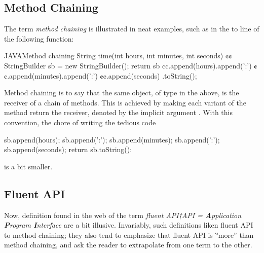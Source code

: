 \subsection{Method Chaining}
The term \emph{method chaining} is illustrated in neat examples, such
as in the  to  line of the following \Java function:
\begin{Code}{JAVA}{Method chaining}
String time(int hours, int minutes, int seconds) {¢¢
  StringBuilder sb = new StringBuilder();
  return sb
    ¢¢.append(hours).append(':')
    ¢¢.append(minutes).append(':')
    ¢¢.append(seconds)
    .toString();
}
\end{Code}
Method chaining is to say that the same object,  of type  in the above,
   is the receiver of a chain of methods.
This is achieved by making each variant of the method  return the receiver, denoted by the
  implicit argument .
With this convention, the chore of writing the tedious code
\begin{JAVA}
sb.append(hours);
sb.append(':');
sb.append(minutes);
sb.append(':');
sb.append(seconds);
return sb.toString():\end{JAVA}
is a bit smaller.

\subsection{Fluent API}
Now, definition found in the web of the term \emph{fluent API†{API =
    \textbf Application \textbf Program \textbf Interface
}} are a bit illusive.
Invariably, such definitions liken fluent API to method chaining;
  they also tend to emphasize that fluent API is ‟more” than method
  chaining, and ask the reader to extrapolate from one term to the other.

